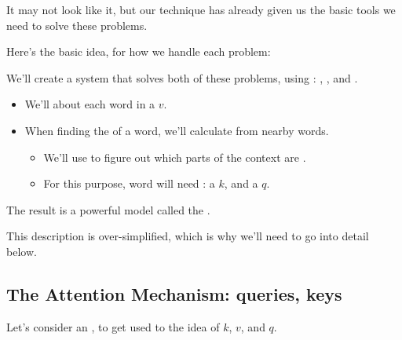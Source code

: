     

    It may not look like it, but our  technique has already given us the basic tools we need to solve these problems.

    Here's the basic idea, for how we handle each problem:\\

    \begin{concept}
        We'll create a system that solves both of these problems, using : , , and .

        \phantom{}

        \begin{itemize}
            \item We'll   about each word in a  $v$.
    
            \item When finding the  of a word, we'll calculate  from nearby words.
    
            \begin{itemize}
                \item We'll use  to figure out which parts of the context are .
                
                \item For this purpose, word will need : a  $k$, and a  $q$.
            \end{itemize}
        \end{itemize}

        \phantom{}

        The result is a powerful model called the .
    \end{concept}

    This description is over-simplified, which is why we'll need to go into detail below.

    

    




    \phantom{}

    \subsection{The Attention Mechanism: queries, keys}

        Let's consider an , to get used to the idea of $k$, $v$, and $q$.

